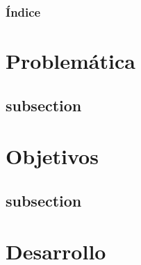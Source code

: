 \documentclass{beamer}
\title
  [\PresentationTitle \hspace{25em} \thepage] %
  {\PresentationTitle}                        %
\author{\AuthorName} %
\institute[\UniversityShortName] %
{
\UniversityName \\ %
\medskip
\FacultyName \\
\medskip
\CollegeMajor
}
\date{\PresentationDate} %
\begin{document}
\begin{frame}
\titlepage
\end{frame}

\begin{frame}
\frametitle{\'{I}ndice}
\tableofcontents 
\end{frame}


\section{Problem\'{a}tica}

  \subsection{subsection} 

\section{Objetivos}
  \subsection{subsection}
\section{Desarrollo}
\end{document}
